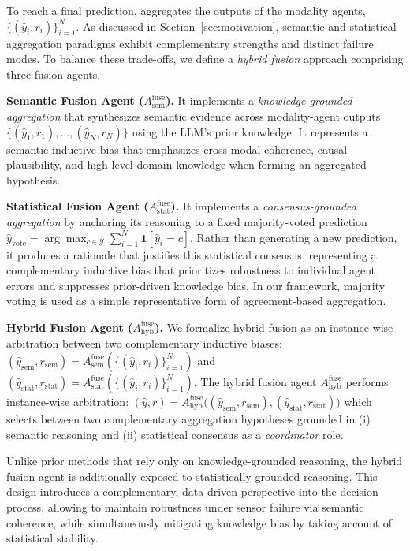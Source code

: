 To reach a final prediction, \system{} aggregates the outputs of the modality agents, $\{(\hat{y}_i, r_i)\}_{i=1}^N$. As discussed in Section~\ref{sec:motivation}, semantic and statistical aggregation paradigms exhibit complementary strengths and distinct failure modes. To balance these trade-offs, we define a \emph{hybrid fusion} approach comprising three fusion agents.

\noindent \textbf{Semantic Fusion Agent ($A^{\text{fuse}}_{\text{sem}}$).} It implements a \textit{knowledge-grounded aggregation} that synthesizes semantic evidence across modality-agent outputs 
$\{(\hat{y}_1, r_1), \ldots, (\hat{y}_N, r_N)\}$ using the LLM's prior knowledge.
It represents a semantic inductive bias that emphasizes cross-modal coherence, causal plausibility, and high-level domain knowledge when forming an aggregated hypothesis.

\noindent  \textbf{Statistical Fusion Agent ($A^{\text{fuse}}_{\text{stat}}$).} It implements a \textit{consensus-grounded aggregation} by anchoring its reasoning to a fixed majority-voted prediction $\hat{y}_{\text{vote}} = \arg\max_{c \in \mathcal{Y}} \sum_{i=1}^{N} \mathbf{1}[\hat{y}_i = c]$. Rather than generating a new prediction, it produces a rationale that justifies this statistical consensus, representing a complementary inductive bias that prioritizes robustness to individual agent errors and suppresses prior-driven knowledge bias. In our framework, majority voting is used as a simple representative form of agreement-based aggregation.

\noindent  \textbf{Hybrid Fusion Agent ($A^{\text{fuse}}_{\text{hyb}}$).} We formalize hybrid fusion as an instance-wise arbitration between two complementary inductive biases: $(\hat{y}_{\text{sem}}, r_{\text{sem}}) = A^{\text{fuse}}_{\text{sem}}(\{(\hat{y}_i, r_i)\}_{i=1}^N)$ and $(\hat{y}_{\text{stat}}, r_{\text{stat}}) = A^{\text{fuse}}_{\text{stat}}(\{(\hat{y}_i, r_i)\}_{i=1}^N)$. The hybrid fusion agent $A^{\text{fuse}}_{\text{hyb}}$ performs instance-wise arbitration: $(\hat{y}, r) = A^{\text{fuse}}_{\text{hyb}}\big((\hat{y}_{\text{sem}}, r_{\text{sem}}), (\hat{y}_{\text{stat}}, r_{\text{stat}})\big)$ which selects between two complementary aggregation hypotheses grounded in (i) semantic reasoning and (ii) statistical consensus as a \textit{coordinator} role.

Unlike prior methods that rely only on knowledge-grounded reasoning, the hybrid fusion agent is additionally exposed to statistically grounded reasoning. This design introduces a complementary, data-driven perspective into the decision process, allowing \system{} to maintain robustness under sensor failure via semantic coherence, while simultaneously mitigating knowledge bias by taking account of statistical stability. %
